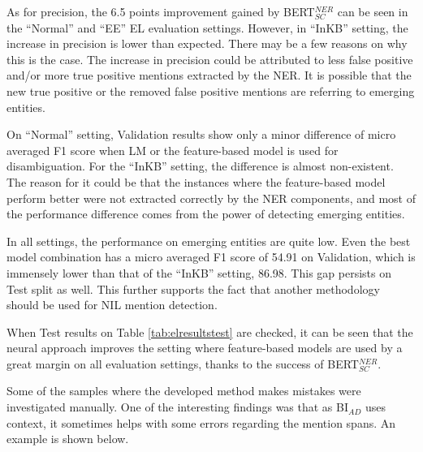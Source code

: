 \documentclass{report}
\theoremstyle{definition}
\theoremstyle{remark}
\begin{document}
As for precision, the 6.5 points improvement gained by BERT$_{SC}^{NER}$ can be seen in the ``Normal'' and ``EE'' EL evaluation settings. However, in ``InKB'' setting, the increase in precision is lower than expected. There may be a few reasons on why this is the case. The increase in precision could be attributed to less false positive and/or more true positive mentions extracted by the NER. It is possible that the new true positive or the removed false positive mentions are referring to emerging entities.

On ``Normal'' setting, Validation results show only a minor difference of micro averaged F1 score when LM or the feature-based model is used for disambiguation. For the ``InKB'' setting, the difference is almost non-existent.  The reason for it could be that the instances where the feature-based model perform better were not extracted correctly by the NER components, and most of the performance difference comes from the power of detecting emerging entities.

In all settings, the performance on emerging entities are quite low. Even the best model combination has a micro averaged F1 score of 54.91 on Validation, which is immensely lower than that of the ``InKB'' setting, 86.98. This gap persists on Test split as well. This further supports the fact that another methodology should be used for NIL mention detection.

When Test results on Table \ref{tab:elresultstest} are checked, it can be seen that the neural approach improves the setting where feature-based models are used by a great margin on all evaluation settings, thanks to the success of BERT$^{NER}_{SC}$. 

Some of the samples where the developed method makes mistakes were investigated manually. One of the interesting findings was that as BI$_{AD}$ uses context, it sometimes helps with some errors regarding the mention spans. An example is shown below.

\begin{center}
\end{center}
\end{document}
